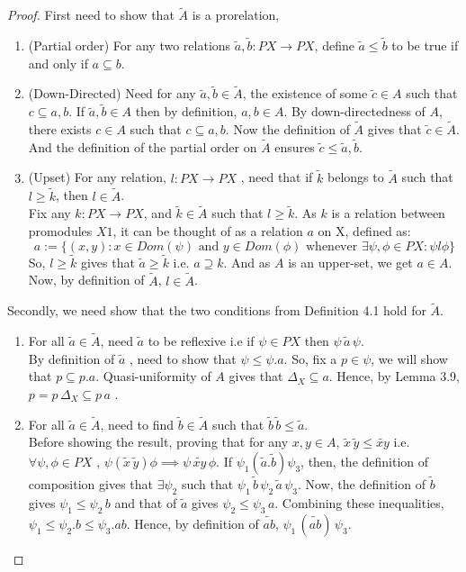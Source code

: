 \documentclass[a4paper]{article}
\makeatletter
\theoremstyle{definition}
\newcommand{\carrow}{}%
\DeclareRobustCommand{\carrow}{%
	\mathrel{\vphantom{\rightarrow}\mathpalette\circle@arrow\relax}%
}
\newcommand{\circle@arrow}[2]{%
	\m@th
	\ooalign{%
		\hidewidth$#1\circ\mkern1mu$\hidewidth\cr
	$#1\longrightarrow$\cr}%
}
\makeatother
\begin{document}
\begin{proof}
	First need to show that $\tilde{A}$ is a prorelation,
	\begin{enumerate}[label=(\roman*)]
		\item (Partial order) For any two relations $\tilde{a},\tilde{b}:PX \to PX $,
			define $ \tilde{a} \leq \tilde{b}$ to be true if and only if
			$a \subseteq b$.
		\item(Down-Directed) Need for any $\tilde{a} ,\tilde{b} \in \tilde{A}$,
			the existence of some $\tilde{c} \in A$ such that $c \subseteq a,b$.
			If $\tilde{a} ,\tilde{b} \in A$ then by definition,
			$a,b \in A$. By down-directedness
			of $A$, there exists $c \in A$ such that  $c \subseteq a,b$. Now the definition
			of $\tilde{A}$ gives that $\tilde{c} \in \tilde{A}$. And the definition of the
			partial order on $\tilde{A}$ ensures $\tilde{c} \leq \tilde{a} ,\tilde{b}$.
		\item (Upset) For any relation, $l:PX \to PX$ , need that if $\tilde{k}$ belongs to
			$\tilde{A}$ such that $l \geq \tilde{k}$, then $l \in \tilde{A}$.\\
			Fix any $k:PX \to PX$, and $\tilde{k} \in \tilde{A}$ such that $l\geq \tilde{k} $.
			As $k$ is a relation between promodules $X \carrow 1$, it can be thought
			of as a relation $a$ on X, defined as:
			\[a:=\{(x,y): x \in Dom(\psi) \text{ and }y \in Dom(\phi)
			\text{ whenever } \exists \psi,\phi \in PX: \psi l \phi\}\]
			So, $l\geq \tilde{k}$ gives that $\tilde{a}\geq \tilde{k}$ i.e. $a \supseteq k.$
			And as $A$ is an upper-set, we get $a\in A$. Now, by definition of $\tilde{A}$,
			$l \in \tilde{A}$.
	\end{enumerate}
	Secondly, we need show that the two conditions from Definition 4.1 hold for $\tilde{A}$.
	\begin{enumerate}[label=(\roman*)]
		\item For all $\tilde{a} \in \tilde{A}$, need $\tilde{a}$ to be reflexive i.e
			if $\psi \in PX$ then $\psi \, \tilde{a} \, \psi$.\\
			By definition of $\tilde{a}$ , need to show that $\psi \leq \psi.a$.
			So, fix a $p \in \psi$, we will show that $p \subseteq p.a$.
			Quasi-uniformity of $A$ gives that $\Delta_X \subseteq a$. Hence,
			by Lemma 3.9,
			$p=p \, \Delta_X \subseteq p \,a$ .
		\item For all $\tilde{a} \in \tilde{A}$, need to find $\tilde{b}\in \tilde{A}$ such that
			$\tilde{b}\, \tilde{b} \leq \tilde{a} $.\\
			Before showing the result, proving that for any $x,y \in A$,
			$\tilde{x} \, \tilde{y} \leq \widetilde{xy}$
			i.e. $\forall \psi, \phi \in PX$ , $\psi(\tilde{x} \, \tilde{y})\phi \implies
			\psi \, \widetilde{xy} \, \phi $.
			If $\psi_1(\tilde{a} .\tilde{b} )\psi_3$, then, the definition of composition
			gives that $\exists \psi_2$ such that $\psi_1 \, \tilde{b} \, \psi_2 \,
			\tilde{a} \, \psi_3$. Now, the definition of $\tilde{b}$ gives $\psi_1 \leq \psi_2
			\,b$ and that of $\tilde{a}$ gives $\psi_2 \leq \psi_3 \, a$. Combining
			these inequalities, $\psi_1 \leq \psi_2.b \leq \psi_3.ab$.
			Hence, by definition of	$\widetilde{ab}$, $\psi_1 \,(\widetilde{ab})\,\psi_3$.


\end{enumerate}
\end{proof}
\end{document}
